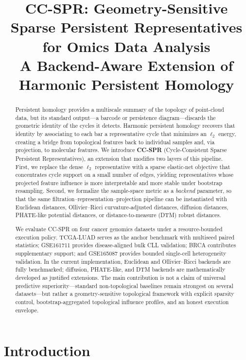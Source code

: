 \documentclass[11pt]{article}
\title{CC-SPR: Geometry-Sensitive Sparse Persistent Representatives\\for Omics Data Analysis\\[6pt]
\large A Backend-Aware Extension of Harmonic Persistent Homology}
\author{}
\date{}
\begin{document}
\maketitle

\begin{abstract}
Persistent homology provides a multiscale summary of the topology of point-cloud data, but its standard output---a barcode or persistence diagram---discards the geometric identity of the cycles it detects.
Harmonic persistent homology recovers that identity by associating to each bar a representative cycle that minimizes an $\ell_2$ energy, creating a bridge from topological features back to individual samples and, via projection, to molecular features.
We introduce \textbf{CC-SPR} (Cycle-Consistent Sparse Persistent Representatives), an extension that modifies two layers of this pipeline.
First, we replace the dense $\ell_2$ representative with a sparse elastic-net objective that concentrates cycle support on a small number of edges, yielding representatives whose projected feature influence is more interpretable and more stable under bootstrap resampling.
Second, we formalize the sample-space metric as a \emph{backend} parameter, so that the same filtration--representation--projection pipeline can be instantiated with Euclidean distances, Ollivier--Ricci curvature-adjusted distances, diffusion distances, PHATE-like potential distances, or distance-to-measure (DTM) robust distances.

We evaluate CC-SPR on four cancer genomics datasets under a resource-bounded execution policy.
TCGA-LUAD serves as the anchor benchmark with multiseed paired statistics; GSE161711 provides disease-aligned bulk CLL validation; BRCA contributes supplementary support; and GSE165087 provides bounded single-cell heterogeneity validation.
In the current implementation, Euclidean and Ollivier--Ricci backends are fully benchmarked; diffusion, PHATE-like, and DTM backends are mathematically developed as justified extensions.
The main contribution is not a claim of universal predictive superiority---standard non-topological baselines remain strongest on several datasets---but rather a geometry-sensitive topological framework with explicit sparsity control, bootstrap-aggregated topological influence profiles, and an honest execution envelope.
\end{abstract}

\section{Introduction}
\end{document}

